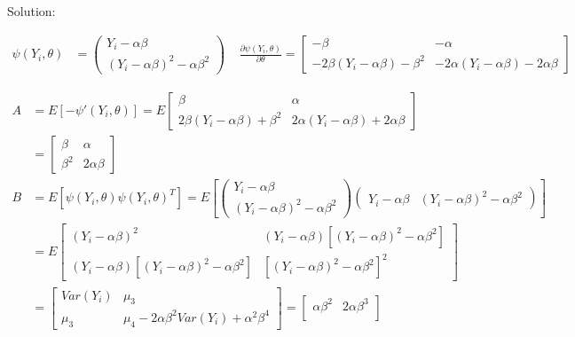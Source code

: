 \documentclass[
  letterpaper,
  DIV=11,
  numbers=noendperiod]{scrreprt}
\begin{document}
Solution:

\[\begin{aligned}
\psi(Y_i, \theta) &=  \begin{pmatrix} Y_i - \alpha \beta \\ (Y_i - \alpha \beta)^2 - \alpha \beta^2\end{pmatrix}
~~~~~\frac{\partial \psi(Y_i, \theta)}{\partial \theta} =
\begin{bmatrix}  -  \beta  & - \alpha\\
-2 \beta (Y_i - \alpha \beta) - \beta^2 & -2\alpha(Y_i - \alpha \beta) -2\alpha \beta\end{bmatrix}
\end{aligned}\]

\[ \begin{aligned}
A &= E[- \psi'(Y_i, \theta)] = E \begin{bmatrix}    \beta  &  \alpha\\
2 \beta (Y_i - \alpha \beta) + \beta^2 & 2\alpha(Y_i - \alpha \beta) +2\alpha \beta\end{bmatrix} \\
&=\begin{bmatrix}    \beta  &  \alpha\\
\beta^2 &  2\alpha \beta\end{bmatrix} \\
B &= E[\psi (Y_i, \theta)\psi (Y_i, \theta)^T] =  E\left[\begin{pmatrix} Y_i - \alpha \beta \\ (Y_i - \alpha \beta)^2 - \alpha \beta^2 \end{pmatrix} \begin{pmatrix} Y_i - \alpha \beta & (Y_i - \alpha \beta)^2 - \alpha \beta^2 \end{pmatrix} \right]\\
&=  E \begin{bmatrix} (Y_i - \alpha \beta)^2 & (Y_i - \alpha \beta)[(Y_i-\alpha \beta)^2 - \alpha \beta^2] \\
(Y_i - \alpha \beta)[(Y_i-\alpha \beta)^2 - \alpha \beta^2] & [(Y_i-\alpha \beta)^2 - \alpha \beta^2]^2\end{bmatrix}\\
&=   \begin{bmatrix} Var(Y_i) & \mu_3 \\
\mu_3 & \mu_4 -2 \alpha \beta^2 Var(Y_i) + \alpha^2\beta^4\end{bmatrix}
=   \begin{bmatrix} \alpha \beta^2 & 2 \alpha \beta^3 \\

\end{bmatrix}
\end{aligned}\]
\end{document}

